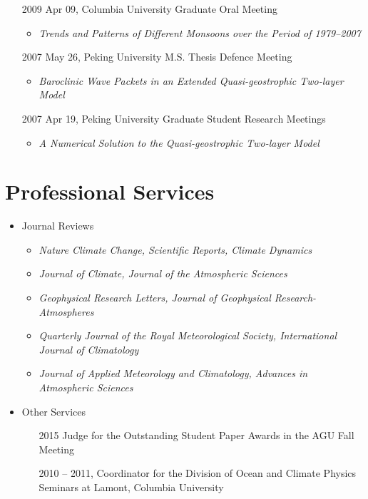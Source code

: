 \documentclass[11pt]{article}
\newcommand{\meetingName}[1]{#1}
\newcommand{\ptitle}[1]{\textit{#1}}
\begin{document}
\begin{itemize}[leftmargin=10ex, itemsep=1ex]
	\item [2009] Apr 09, \meetingName{Columbia University Graduate Oral Meeting}
	\begin{itemize}[leftmargin=4ex]
		\item \ptitle{Trends and Patterns of Different Monsoons over the Period of 1979--2007}
		\end{itemize}

	\item [2007]May 26,  \meetingName{Peking University M.S. Thesis Defence Meeting}
	\begin{itemize}[leftmargin=4ex]
		\item \ptitle{Baroclinic Wave Packets in an Extended Quasi-geostrophic Two-layer Model}
		\end{itemize}

	\item [2007]Apr 19, \meetingName{Peking University Graduate Student Research Meetings}
	\begin{itemize}[leftmargin=4ex]
		\item \ptitle{A Numerical Solution to the Quasi-geostrophic Two-layer Model}
		\end{itemize}

\end{itemize}


\section{Professional Services}
\begin{itemize}[leftmargin=4ex, itemsep=1ex]
	\item Journal Reviews
    	\begin{itemize}[leftmargin=4ex]
	\item \textit{Nature Climate Change, Scientific Reports, Climate Dynamics}
    	\item \textit{Journal of Climate, Journal of the Atmospheric Sciences}
	\item \textit{Geophysical Research Letters, Journal of Geophysical Research-Atmospheres}
	\item \textit{Quarterly Journal of the Royal Meteorological Society, International Journal of Climatology}
	\item \textit{Journal of Applied Meteorology and Climatology, Advances in Atmospheric Sciences}
    	\end{itemize}

	\item Other Services
	\begin{itemize}[leftmargin=10ex]
		\item[2015] Judge for the Outstanding Student Paper Awards in the AGU Fall Meeting
		\item[2010]-- 2011, Coordinator for the Division of Ocean and Climate Physics Seminars at Lamont, Columbia University
	\end{itemize}
\end{itemize}
\end{document}
